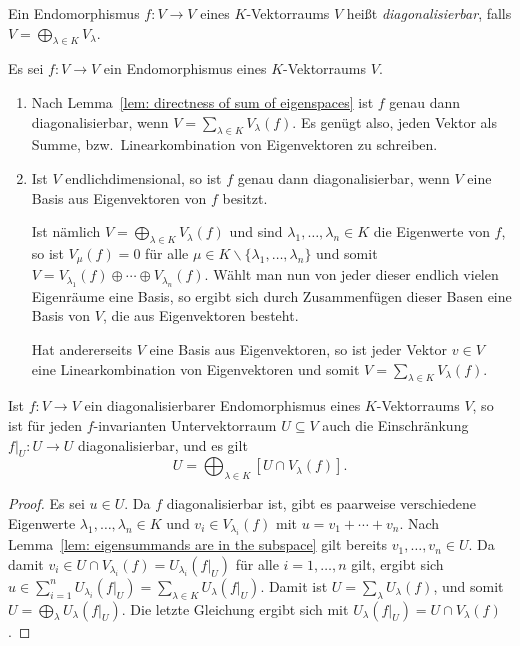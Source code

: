 \begin{definition}
  Ein Endomorphismus $f \colon V \to V$ eines $K$-Vektorraums $V$ heißt \emph{diagonalisierbar}, falls $V = \bigoplus_{\lambda \in K} V_\lambda$.
\end{definition}


\begin{remark}
  Es sei $f \colon V \to V$ ein Endomorphismus eines $K$-Vektorraums $V$.
  \begin{enumerate}[leftmargin=*, label=\roman*)]
    \item
      Nach Lemma~\ref{lem: directness of sum of eigenspaces} ist $f$ genau dann diagonalisierbar, wenn $V = \sum_{\lambda \in K} V_\lambda(f)$.
      Es genügt also, jeden Vektor als Summe, bzw.\ Linearkombination von Eigenvektoren zu schreiben.
    \item
      Ist $V$ endlichdimensional, so ist $f$ genau dann diagonalisierbar, wenn $V$ eine Basis aus Eigenvektoren von $f$ besitzt.
      
      Ist nämlich $V = \bigoplus_{\lambda \in K} V_\lambda(f)$ und sind $\lambda_1, \dotsc, \lambda_n \in K$ die Eigenwerte von $f$, so ist $V_\mu(f) = 0$ für alle $\mu \in K \smallsetminus \{\lambda_1, \dotsc, \lambda_n\}$ und somit $V = V_{\lambda_1}(f) \oplus \dotsb \oplus V_{\lambda_n}(f)$.
      Wählt man nun von jeder dieser endlich vielen Eigenräume eine Basis, so ergibt sich durch Zusammenfügen dieser Basen eine Basis von $V$, die aus Eigenvektoren besteht.
      
      Hat andererseits $V$ eine Basis aus Eigenvektoren, so ist jeder Vektor $v \in V$ eine Linearkombination von Eigenvektoren und somit $V = \sum_{\lambda \in K} V_\lambda(f)$.
  \end{enumerate}
\end{remark}


\begin{proposition}
  Ist $f \colon V \to V$ ein diagonalisierbarer Endomorphismus eines $K$-Vek\-tor\-raums $V$, so ist für jeden $f$-invarianten Untervektorraum $U \subseteq V$ auch die Einschränkung $f|_U \colon U \to U$ diagonalisierbar, und es gilt
  \[
    U = \bigoplus_{\lambda \in K} [ U \cap V_\lambda(f) ].
  \]
\end{proposition}


\begin{proof}
  Es sei $u \in U$.
  Da $f$ diagonalisierbar ist, gibt es paarweise verschiedene Eigenwerte $\lambda_1, \dotsc, \lambda_n \in K$ und $v_i \in V_{\lambda_i}(f)$ mit $u = v_1 + \dotsb + v_n$.
  Nach Lemma~\ref{lem: eigensummands are in the subspace} gilt bereits $v_1, \dotsc, v_n \in U$.
  Da damit $v_i \in U \cap V_{\lambda_i}(f) = U_{\lambda_i}(f|_U)$ für alle $i = 1, \dotsc, n$ gilt, ergibt sich $u \in \sum_{i=1}^n U_{\lambda_i}(f|_U) = \sum_{\lambda \in K} U_{\lambda}(f|_U)$.
  Damit ist $U = \sum_{\lambda} U_\lambda(f)$, und somit \mbox{$U = \bigoplus_{\lambda} U_\lambda(f|_U)$}.
  Die letzte Gleichung ergibt sich mit $U_\lambda(f|_U) = U \cap V_\lambda(f)$.
\end{proof}


